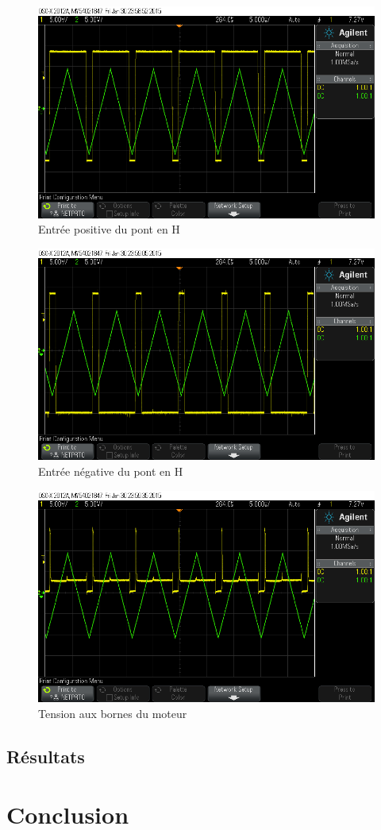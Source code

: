 \documentclass[a4paper]{article}
\begin{document}
\begin{figure}[h!]
  \centering
    \includegraphics[width=1\textwidth]{scope_1}
  \caption{Entrée positive du pont en H}
\end{figure}

\begin{figure}[h!]
  \centering
    \includegraphics[width=1\textwidth]{scope_2}
  \caption{Entrée négative du pont en H}
\end{figure}

\begin{figure}[h!]
  \centering
    \includegraphics[width=1\textwidth]{scope_3}
  \caption{Tension aux bornes du moteur}
\end{figure}

\subsection{Résultats}

\newpage

\section{Conclusion}
\end{document}
